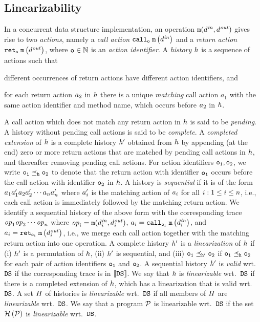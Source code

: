 \subsection{Linearizability}
In a concurrent
data structure implementation, an operation ${\tt m}(d^{\it in},d^{\it out})$
gives rise to two {\it actions}, namely
a {\it call action} $\mathtt{call}_{\tt o}\; {\tt m}\left(d^{\it in}\right)$ and 
a {\it return action} $\mathtt{ret}_{\tt o}\; {\tt m}\left(d^{\it out}\right)$, where $\tt o\in\mathbb{N}$ is an
{\it action identifier}.
%
A {\it history} $h$ is a sequence of actions such that
\begin{inparaenum}[(i)]
\item
  different occurrences of return actions have different action identifiers, and
\item
  for each return action $a_2$ in $h$ there is a unique
{\it matching}  call action $a_1$ with the same action identifier and method name, which occurs before $a_2$ in $h$.
\end{inparaenum}
%
A call action which does not match any return action in $h$ is said
to be {\em pending}.
A history without pending call actions is said to be {\em complete}.
A {\em completed extension} of $h$ is a complete history
$h'$ obtained from $h$ by
  appending (at the end) zero or more return actions that are matched by
  pending call actions in $h$, and
  thereafter removing pending call actions.
%
For action identifiers $\tt o_1,\tt o_2$, we write
$\tt o_1\preceq_{h}\tt o_2$ to denote that
the return action with identifier $\tt o_1$ occurs before
the call action with identifier $\tt o_2$ in $h$.
A history is {\it sequential} if it is of the form
$a_1a'_1a_2a'_2\cdots a_na'_n$
where $a'_i$ is the matching action of $a_i$ 
for all $i:1\leq i\leq n$, i.e., each call action 
is immediately followed by the matching return action. 
%
We identify a sequential history of the above form with
the corresponding trace 
${\it op}_1{\it op}_2\cdots{\it op}_n$ where
${\it op}_i={\tt m}(d^{\it in}_i,d^{\it out}_i)$,
$a_i=\mathtt{call}_{\tt o_i}\; {\tt m}\left(d^{\it in}_{i}\right)$, and
$a_i=\mathtt{ret}_{\tt o_i}\; {\tt m}\left(d^{\it out}_{i}\right)$,
i.e., we merge each call action together with the matching return action
into one operation.
%
A complete history $h'$ 
is a {\it linearization} of $h$ if
(i) $h'$ is a permutation of $h$,
(ii) $h'$ is sequential, 
and
(iii) $\tt o_1\preceq_{h'}\tt o_2$
if $\tt o_1\preceq_{h}\tt o_2$
for each pair of action identifiers $\tt o_1$ and $\tt o_2$.
%
A sequential history $h'$ is {\it valid} wrt.\ ${\tt DS}$ if
the corresponding trace is in $\left\llbracket{{\tt DS}}\right\rrbracket$.
%
We say that $h$ is {\it linearizable} wrt.\ ${\tt DS}$ if there is
a completed extension of $h$, which has
a linearization that is valid wrt.\ ${\tt DS}$.
%
A set $H$ of histories is {\it linearizable} wrt.\ ${\tt DS}$ if 
all members of $H$ are  {\it linearizable} wrt.\ ${\tt DS}$.
We say that a program ${\mathcal P}$ is linearizable wrt.\ 
${\tt DS}$ if the set 
${\mathcal H}\left({\mathcal P}\right)$ is {\em linearizable} wrt.\ ${\tt DS}$.

